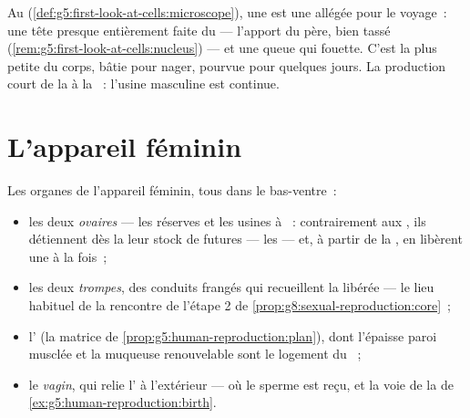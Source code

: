 \begin{example}\label{ex:g8:reproductive-systems:sperm}
Au 
(\cref{def:g5:first-look-at-cells:microscope}), une  est
une  allégée pour le voyage~: une tête presque entièrement
faite du  --- l'apport du père, bien tassé
(\cref{rem:g5:first-look-at-cells:nucleus}) --- et une queue qui
fouette. C'est la plus petite  du corps, bâtie pour nager,
pourvue pour quelques jours. La production court de la  à la
~: l'usine masculine est continue.
\end{example}

\section{L'appareil féminin}

\begin{definition}\label{def:g8:reproductive-systems:female}
Les organes de l'appareil féminin, tous dans le bas-ventre~:
\begin{itemize}
  \item les deux \emph{ovaires} --- les réserves et
        les usines à ~: contrairement aux , ils
        détiennent dès la  leur stock de futures
        \emph{} --- les  --- et, à partir de la
        , en libèrent une à la fois~;
  \item les deux \emph{trompes}, des conduits frangés
        qui recueillent la  libérée --- le lieu habituel
        de la rencontre de l'étape 2 de
        \cref{prop:g8:sexual-reproduction:core}~;
  \item l'\emph{} (la matrice de
        \cref{prop:g5:human-reproduction:plan}), dont l'épaisse
        paroi musclée et la muqueuse renouvelable sont le logement
        du ~;
  \item le \emph{vagin}, qui relie l' à l'extérieur --- où le
        sperme est reçu, et la voie de la  de
        \cref{ex:g5:human-reproduction:birth}.
\end{itemize}
\end{definition}


